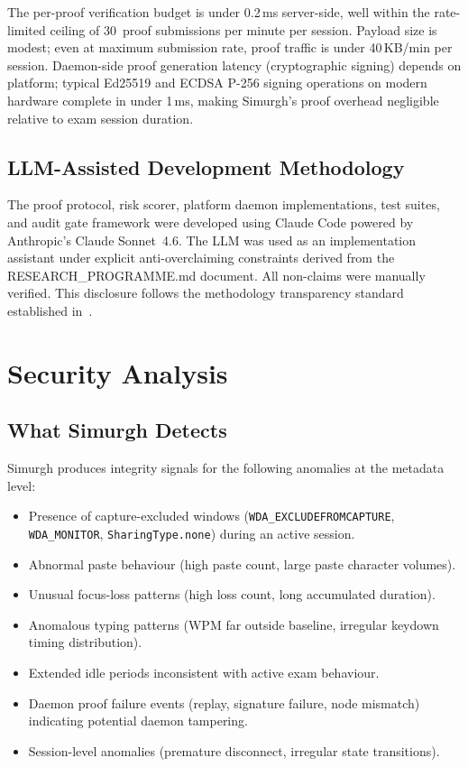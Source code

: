 \documentclass[conference]{IEEEtran}
\begin{document}
The per-proof verification budget is under 0.2\,ms server-side, well within the rate-limited ceiling of 30~proof submissions per minute per session. Payload size is modest; even at maximum submission rate, proof traffic is under 40\,KB/min per session. Daemon-side proof generation latency (cryptographic signing) depends on platform; typical Ed25519 and ECDSA P-256 signing operations on modern hardware complete in under 1\,ms, making Simurgh's proof overhead negligible relative to exam session duration.

\subsection{LLM-Assisted Development Methodology}

The proof protocol, risk scorer, platform daemon implementations, test suites, and audit gate framework were developed using Claude Code powered by Anthropic's Claude Sonnet~4.6. The LLM was used as an implementation assistant under explicit anti-overclaiming constraints derived from the RESEARCH\_PROGRAMME.md document. All non-claims were manually verified. This disclosure follows the methodology transparency standard established in~\cite{abedini2026invisible}.

\section{Security Analysis}

\subsection{What Simurgh Detects}

Simurgh produces integrity signals for the following anomalies at the metadata level:
\begin{itemize}
\item Presence of capture-excluded windows (\texttt{WDA\_EXCLUDEFROMCAPTURE}, \texttt{WDA\_MONITOR}, \texttt{SharingType.none}) during an active session.
\item Abnormal paste behaviour (high paste count, large paste character volumes).
\item Unusual focus-loss patterns (high loss count, long accumulated duration).
\item Anomalous typing patterns (WPM far outside baseline, irregular keydown timing distribution).
\item Extended idle periods inconsistent with active exam behaviour.
\item Daemon proof failure events (replay, signature failure, node mismatch) indicating potential daemon tampering.
\item Session-level anomalies (premature disconnect, irregular state transitions).
\end{itemize}
\end{document}
